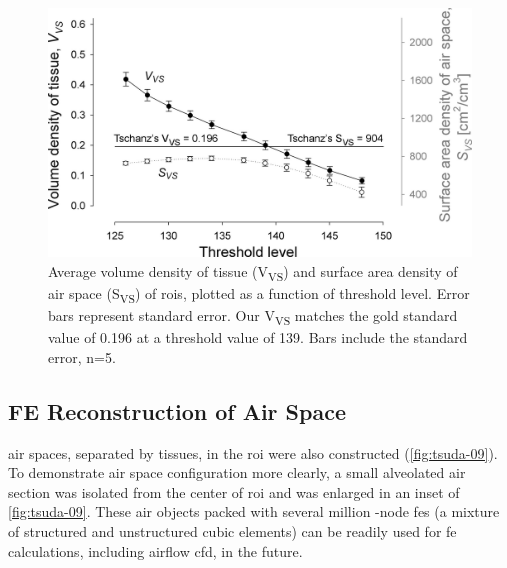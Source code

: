 \renewcommand{\imsize}{\linewidth}
\begin{figure}
	\centering
	\includegraphics[width=\imsize]{img/Tsuda2008/Tsuda-08}
	\caption[Tissue volume- and airspace surface area-density]{Average volume density of tissue (V\textsubscript{VS}) and surface area density of air space (S\textsubscript{VS}) of \acp{roi}, plotted as a function of threshold level. Error bars represent standard error. Our V\textsubscript{VS} matches the gold standard value of 0.196 at a threshold value of 139. Bars include the standard error, n=5.}
	\label{fig:VVSplot}
\end{figure}

\subsection{FE \threed Reconstruction of Air Space}
\threed air spaces, separated by tissues, in the \ac{roi} were also constructed (\autoref{fig:tsuda-09}). To demonstrate air space configuration more clearly, a small alveolated air section was isolated from the center of \ac{roi} and was enlarged in an inset of \autoref{fig:tsuda-09}. These \threed air objects packed with several million -node \acp{fe} (a mixture of structured and unstructured cubic elements) can be readily used for \ac{fe} calculations, including airflow \ac{cfd}, in the future.

